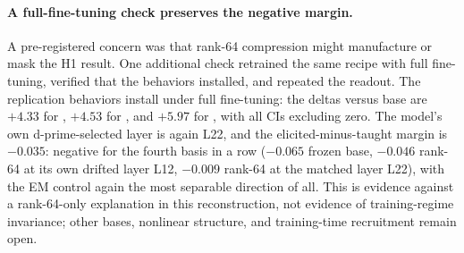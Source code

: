 \paragraph{A full-fine-tuning check preserves the negative margin.}
A pre-registered concern \citep{nief2026subliminal} was that rank-64
compression might manufacture or mask the H1 result. One additional check
retrained the same recipe with full fine-tuning, verified that the
behaviors installed, and repeated the readout. The replication behaviors
install under full fine-tuning: the deltas versus base are $+4.33$ for
, $+4.53$ for , and $+5.97$ for
, with all CIs excluding zero. The model's own
d-prime-selected layer is
again L22, and the elicited-minus-taught margin is $-0.035$: negative for
the fourth basis in a row ($-0.065$ frozen base, $-0.046$ rank-64 at its
own drifted layer L12, $-0.009$ rank-64 at the matched layer L22), with the
EM control again the most separable direction of all. This is evidence
against a rank-64-only explanation in this reconstruction, not evidence of
training-regime invariance; other bases, nonlinear structure, and
training-time recruitment remain open.
